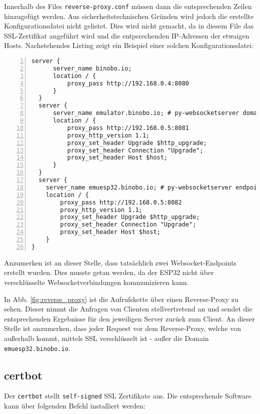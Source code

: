 \documentclass[paper=a4,12pt]{scrreprt}
\begin{document}
Innerhalb des Files \texttt{reverse-proxy.conf} müssen dann die entsprechenden Zeilen hinzugefügt werden. Aus sicherheitstechnischen Gründen wird jedoch die erstellte Konfigurationsdatei nicht gelistet. Dies wird nicht gemacht, da in diesem File das SSL-Zertifikat angeführt wird und die entpsrechenden IP-Adressen der etwaigen Hosts.\newline
Nachstehendes Listing zeigt ein Beispiel einer solchen Konfigurationsdatei:\newline

\begin{lstlisting}[caption={reverse-proxy.conf}, captionpos=b, label={listing:rev_proxy_conf},  numbers=left, stepnumber=1]
  server {
      server_name binobo.io;
      location / {
          proxy_pass http://192.168.0.4:8080
      }
  }
  server {
      server_name emulator.binobo.io; # py-websocketserver domain
      location / {
          proxy_pass http://192.168.0.5:8081
          proxy_http_version 1.1;
          proxy_set_header Upgrade $http_upgrade;
          proxy_set_header Connection "Upgrade";
          proxy_set_header Host $host;
      }
  }
  server {
    server_name emuesp32.binobo.io; # py-websocketserver endpoint for esp32
    location / {
        proxy_pass http://192.168.0.5:8082
        proxy_http_version 1.1;
        proxy_set_header Upgrade $http_upgrade;
        proxy_set_header Connection "Upgrade";
        proxy_set_header Host $host;
    }
}
\end{lstlisting}

Anzumerken ist an dieser Stelle, dass tatsächlich zwei Websocket-Endpoints erstellt wurden. Dies musste getan werden, da der ESP32 nicht über verschlüsselte Websocketverbindungen kommunizieren kann.\newline

In Abb. \ref{fig:reverse_proxy} ist die Aufrufskette über einen Reverse-Proxy zu sehen. Dieser nimmt die Anfragen von Clienten stellvertretend an und sendet die entsprechenden Ergebnisse für den jeweiligen Server zurück zum Client. An dieser Stelle ist anzumerken, dass jeder Request vor dem Reverse-Proxy, welche von außerhalb kommt, mittels SSL verschlüsselt ist - außer die Domain \texttt{emuesp32.binobo.io}.\newline

\subsection{certbot}

Der \texttt{certbot}\cite{certbot} stellt \texttt{self-signed} SSL Zertifikate aus. Die entsprechende Software kann über folgenden Befehl installiert werden:\newline
\end{document}
